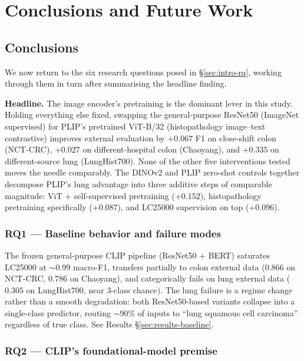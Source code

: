 \chapter{Conclusions and Future Work}\label{chp:conclusion}

\section{Conclusions}
\label{sec:concl-conclusions}

We now return to the six research questions posed in §\ref{sec:intro-rq}, working through them in turn after summarising the headline finding.

\noindent\textbf{Headline.} The image encoder's pretraining is the dominant lever in this study. Holding everything else fixed, swapping the general-purpose ResNet50 (ImageNet supervised) for PLIP's pretrained ViT-B/32 (histopathology image--text contrastive) improves external evaluation by $+0.067$ F1 on close-shift colon (NCT-CRC), $+0.027$ on different-hospital colon (Chaoyang), and $+0.335$ on different-source lung (LungHist700). None of the other five interventions tested moves the needle comparably. The DINOv2 and PLIP zero-shot controls together decompose PLIP's lung advantage into three additive steps of comparable magnitude: ViT + self-supervised pretraining ($+0.152$), histopathology pretraining specifically ($+0.087$), and LC25000 supervision on top ($+0.096$).

\subsection*{RQ1 --- Baseline behavior and failure modes}

The frozen general-purpose CLIP pipeline (ResNet50 + BERT) saturates LC25000 at $\sim 0.99$ macro-F1, transfers partially to colon external data ($0.866$ on NCT-CRC, $0.786$ on Chaoyang), and categorically fails on lung external data ($0.305$ on LungHist700, near 3-class chance). The lung failure is a regime change rather than a smooth degradation: both ResNet50-based variants collapse into a single-class predictor, routing $\sim 90\%$ of inputs to ``lung squamous cell carcinoma'' regardless of true class. See Results §\ref{sec:results-baseline}.

\subsection*{RQ2 --- CLIP's foundational-model premise}

